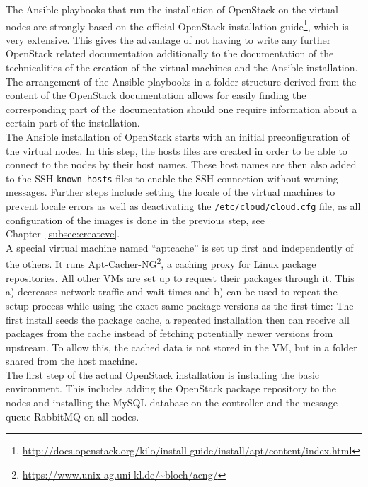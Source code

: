 The Ansible playbooks that run the installation of OpenStack on the virtual nodes are strongly based on the official OpenStack installation guide\footnote{\url{http://docs.openstack.org/kilo/install-guide/install/apt/content/index.html}}, which is very extensive. This gives the advantage of not having to write any further OpenStack related documentation additionally to the documentation of the technicalities of the creation of the virtual machines and the Ansible installation. The arrangement of the Ansible playbooks in a folder structure derived from the content of the OpenStack documentation allows for easily finding the corresponding part of the documentation should one require information about a certain part of the installation.\\

The Ansible installation of OpenStack starts with an initial preconfiguration of the virtual nodes. In this step, the hosts files are created in order to be able to connect to the nodes by their host names. These host names are then also added to the SSH \verb|known_hosts| files to enable the SSH connection without warning messages. Further steps include setting the locale of the virtual machines to prevent locale errors as well as deactivating the \verb|/etc/cloud/cloud.cfg| file, as all configuration of the images is done in the previous step, see Chapter~\ref{subsec:createve}.\\

A special virtual machine named ``aptcache'' is set up first and independently of the others. It runs Apt-Cacher-NG\footnote{\url{https://www.unix-ag.uni-kl.de/~bloch/acng/}}, a caching proxy for Linux package repositories. All other VMs are set up to request their packages through it. This a) decreases network traffic and wait times and b) can be used to repeat the setup process while using the exact same package versions as the first time: The first install seeds the package cache, a repeated installation then can receive all packages from the cache instead of fetching potentially newer versions from upstream. To allow this, the cached data is not stored in the VM, but in a folder shared from the host machine.\\

The first step of the actual OpenStack installation is installing the basic environment. This includes adding the OpenStack package repository to the nodes and installing the MySQL database on the controller and the message queue RabbitMQ on all nodes.\\

